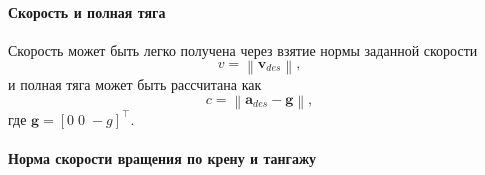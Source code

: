 \documentclass[12pt,a4paper,fleqn]{article}
\newcommand{\bVec}[1]{\mathbf{#1}}
\newcommand{\norm}[1]{\left\lVert#1\right\rVert}
\begin{document}
\paragraph{Скорость и полная тяга\newline\newline}
Скорость может быть легко получена через взятие нормы 
заданной скорости
%
\begin{equation}
	v = \norm{\bVec{v}_{des}},
\end{equation}
%
и полная тяга может быть рассчитана как
%
\begin{equation}
	c = \norm{\bVec{a}_{des} - \bVec{g}},
\end{equation}
%
где $\bVec{g} = [0 \; 0 \; -g]^{\top}$.

\paragraph{Норма скорости вращения по крену и тангажу
\newline\newline}
\end{document}
